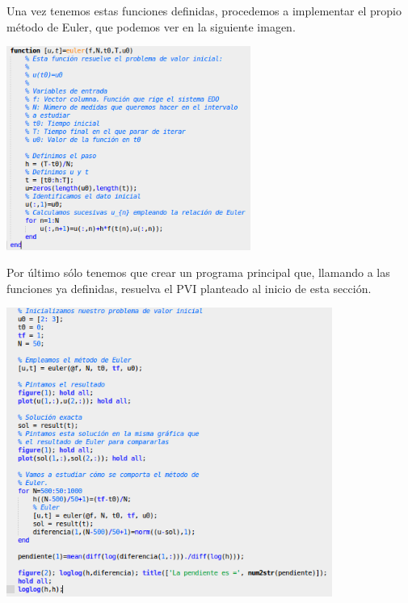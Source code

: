 \documentclass{apuntes}
\begin{document}
Una vez tenemos estas funciones definidas, procedemos a implementar el propio método de Euler, que podemos ver en la siguiente imagen.

\begin{center}
\includegraphics[width=0.6\textwidth]{img/euler.png}
\end{center}

Por último sólo tenemos que crear un programa principal que, llamando a las funciones ya definidas, resuelva el PVI planteado al inicio de esta sección.

\begin{center}
\includegraphics[width=0.8\textwidth]{img/aplicacion_euler.png}
\end{center}
\end{document}
